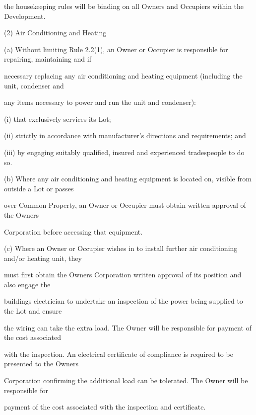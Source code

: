\documentclass{article}
\begin{document}
{\fontsize{10.02}{1}the housekeeping rules will be binding on all Owners and Occupiers within the Development. }

{\fontsize{9.962}{1}(2) Air Conditioning and Heating }

{\fontsize{9.962}{1}(a) Without limiting Rule 2.2(1), an Owner or Occupier is responsible for repairing, maintaining and if }

{\fontsize{10.02}{1}necessary replacing any air conditioning and heating equipment (including the unit, condenser and }

{\fontsize{10.02}{1}any items necessary to power and run the unit and condenser): }

{\fontsize{9.962}{1}(i) that exclusively services its Lot; }

{\fontsize{9.962}{1}(ii) strictly in accordance with manufacturer’s directions and requirements; and }

{\fontsize{9.962}{1}(iii) by engaging suitably qualified, insured and experienced tradespeople to do so. }

{\fontsize{9.962}{1}(b) Where any air conditioning and heating equipment is located on, visible from outside a Lot or passes }

{\fontsize{10.02}{1}over Common Property, an Owner or Occupier must obtain written approval of the Owners }

{\fontsize{10.02}{1}Corporation before accessing that equipment. }

{\fontsize{9.962}{1}(c) Where an Owner or Occupier wishes in to install further air conditioning and/or heating unit, they }

{\fontsize{10.02}{1}must first obtain the Owners Corporation written approval of its position and also engage the }

{\fontsize{10.02}{1}buildings electrician to undertake an inspection of the power being supplied to the Lot and ensure }

{\fontsize{10.02}{1}the wiring can take the extra load. The Owner will be responsible for payment of the cost associated }

{\fontsize{10.02}{1}with the inspection. An electrical certificate of compliance is required to be presented to the Owners }

{\fontsize{10.02}{1}Corporation confirming the additional load can be tolerated. The Owner will be responsible for }

{\fontsize{10.02}{1}payment of the cost associated with the inspection and certificate. }
\end{document}
